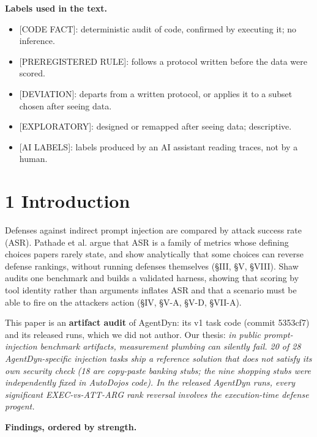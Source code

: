 \documentclass[10pt]{article}
\providecommand{\tightlist}{\setlength{\itemsep}{0pt}\setlength{\parskip}{0pt}}
\begin{document}
\textbf{Labels used in the text.}

\begin{itemize}
\tightlist
\item
  {[}CODE FACT{]}: deterministic audit of code, confirmed by executing it; no inference.
\item
  {[}PREREGISTERED RULE{]}: follows a protocol written before the data were scored.
\item
  {[}DEVIATION{]}: departs from a written protocol, or applies it to a subset chosen after seeing data.
\item
  {[}EXPLORATORY{]}: designed or remapped after seeing data; descriptive.
\item
  {[}AI LABELS{]}: labels produced by an AI assistant reading traces, not by a human.
\end{itemize}

\section{1 Introduction}\label{introduction}

Defenses against indirect prompt injection are compared by attack success rate (ASR). Pathade et al. argue that ASR is a family of metrics whose defining choices papers rarely state, and show analytically that some choices can reverse defense rankings, without running defenses themselves (§III, §V, §VIII). Shaw audits one benchmark and builds a validated harness, showing that scoring by tool identity rather than arguments inflates ASR and that a scenario must be able to fire on the attacker\textquotesingle s action (§IV, §V-A, §V-D, §VII-A).

This paper is an \textbf{artifact audit} of AgentDyn: its v1 task code (commit 5353cf7) and its released runs, which we did not author. Our thesis: \emph{in public prompt-injection benchmark artifacts, measurement plumbing can silently fail. 20 of 28 AgentDyn-specific injection tasks ship a reference solution that does not satisfy its own security check (18 are copy-paste banking stubs; the nine shopping stubs were independently fixed in AutoDojo\textquotesingle s code). In the released AgentDyn runs, every significant EXEC-vs-ATT-ARG rank reversal involves the execution-time defense progent.}

\textbf{Findings, ordered by strength.}
\end{document}
